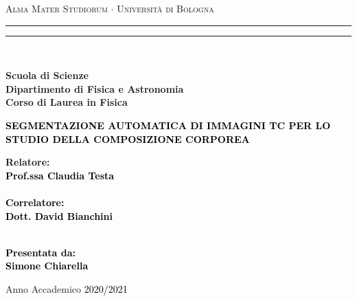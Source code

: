 \begin{titlepage}
%
%
%
%
\begin{center}
{{\Large{\textsc{Alma Mater Studiorum $\cdot$ Universit\`a di Bologna}}}} 
\rule[0.1cm]{15.8cm}{0.1mm}
\rule[0.5cm]{15.8cm}{0.6mm}
\\\vspace{3mm}

{\small{\bf Scuola di Scienze \\ 
Dipartimento di Fisica e Astronomia\\
Corso di Laurea in Fisica}}

\end{center}

\vspace{20mm}

\begin{center}\textcolor{black}{
%
%
\begin{spacing}{2}
{\LARGE{\bf SEGMENTAZIONE AUTOMATICA DI IMMAGINI TC PER LO STUDIO DELLA COMPOSIZIONE CORPOREA}}\\
\end{spacing}
}\end{center}

\vspace{30mm} \par \noindent

\begin{minipage}[t]{0.47\textwidth}
%
%
{\large{\bf Relatore: \vspace{2mm}\\\textcolor{black}{
Prof.ssa Claudia Testa}\\\\
%
%
%
\textcolor{black}{
\bf Correlatore:
\vspace{2mm}\\
Dott. David Bianchini\\\\}}}
\end{minipage}
%
\hfill
%
\begin{minipage}[t]{0.47\textwidth}\raggedleft \textcolor{black}{
{\large{\bf Presentata da:
\vspace{2mm}\\
%
%
Simone Chiarella}}}
\end{minipage}

\vspace{30mm}

\begin{center}
%
%
Anno Accademico \textcolor{black}{ 2020/2021}
\end{center}

\end{titlepage}
